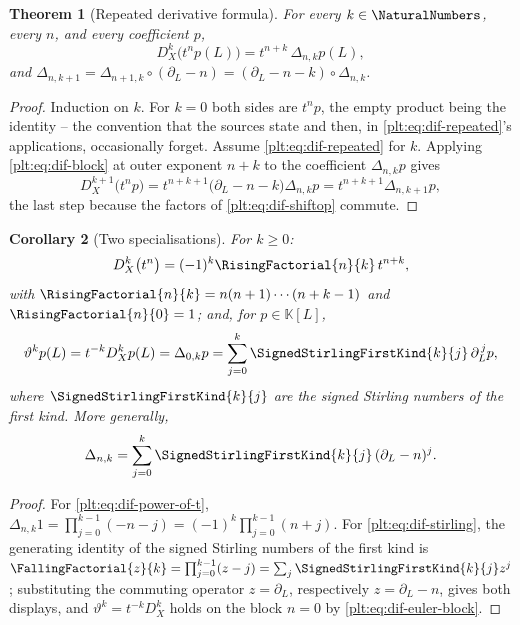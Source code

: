 \documentclass[11pt,oneside]{article}
\theoremstyle{plain}
\newtheorem{theorem}{Theorem}[section]
\newtheorem{corollary}[theorem]{Corollary}
\theoremstyle{definition}
\theoremstyle{remark}
\newcommand{\K}{\mathbb{K}}
\newcommand{\DX}{D_{X}}                                  %
\newcommand{\EulerOp}{\vartheta}                         %
\newcommand{\shiftop}[2]{\Delta_{#1,#2}}                 %
\newcommand{\stirlingsigned}[2]{\SignedStirlingFirstKind{#1}{#2}}
\begin{document}
\begin{theorem}[Repeated derivative formula]\label{plt:thm:dif-repeated}
For every \(k\in\NaturalNumbers\), every \(n\), and every coefficient \(p\),
\begin{equation}\label{plt:eq:dif-repeated}
  \DX^{k}\bigl(t^{n}p(L)\bigr)=t^{n+k}\,\shiftop{n}{k}p(L),
\end{equation}
and \(\shiftop{n}{k+1}=\shiftop{n+1}{k}\circ(\partial_{L}-n)
=(\partial_{L}-n-k)\circ\shiftop{n}{k}\).
\end{theorem}

\begin{proof}
Induction on \(k\).  For \(k=0\) both sides are \(t^{n}p\), the empty product
being the identity -- the convention that the sources state and then, in
\cref{plt:eq:dif-repeated}'s applications, occasionally forget.  Assume
\cref{plt:eq:dif-repeated} for \(k\).  Applying \cref{plt:eq:dif-block} at
outer exponent \(n+k\) to the coefficient \(\shiftop{n}{k}p\) gives
\[
  \DX^{k+1}\bigl(t^{n}p\bigr)
  =t^{n+k+1}\bigl(\partial_{L}-n-k\bigr)\shiftop{n}{k}p
  =t^{n+k+1}\shiftop{n}{k+1}p ,
\]
the last step because the factors of \cref{plt:eq:dif-shiftop} commute.
\end{proof}

\begin{corollary}[Two specialisations]\label{plt:cor:dif-stirling}
For \(k\ge0\):
\begin{equation}\label{plt:eq:dif-power-of-t}
  \DX^{k}\bigl(t^{n}\bigr)
  =(-1)^{k}\RisingFactorial{n}{k}\,t^{n+k},
\end{equation}
with \(\RisingFactorial{n}{k}=n(n+1)\cdots(n+k-1)\) and
\(\RisingFactorial{n}{0}=1\); and, for \(p\in\K[L]\),
\begin{equation}\label{plt:eq:dif-stirling}
  \EulerOp^{k}p(L)=t^{-k}\DX^{k}p(L)
  =\shiftop{0}{k}p
  =\sum_{j=0}^{k}\stirlingsigned{k}{j}\,\partial_{L}^{\,j}p ,
\end{equation}
where \(\stirlingsigned{k}{j}\) are the signed Stirling numbers of the first
kind.  More generally,
\[
  \shiftop{n}{k}
  =\sum_{j=0}^{k}\stirlingsigned{k}{j}\,(\partial_{L}-n)^{j}.
\]
\end{corollary}

\begin{proof}
For \cref{plt:eq:dif-power-of-t}, \(\shiftop{n}{k}1=\prod_{j=0}^{k-1}(-n-j)
=(-1)^{k}\prod_{j=0}^{k-1}(n+j)\).  For \cref{plt:eq:dif-stirling}, the
generating identity of the signed Stirling numbers of the first kind is
\(\FallingFactorial{z}{k}=\prod_{j=0}^{k-1}(z-j)=\sum_{j}
\stirlingsigned{k}{j}z^{j}\) \cite{comtet-book,graham-knuth-patashnik};
substituting the commuting operator \(z=\partial_{L}\), respectively
\(z=\partial_{L}-n\), gives both displays, and \(\EulerOp^{k}=t^{-k}\DX^{k}\)
holds on the block \(n=0\) by \cref{plt:eq:dif-euler-block}.
\end{proof}
\end{document}
